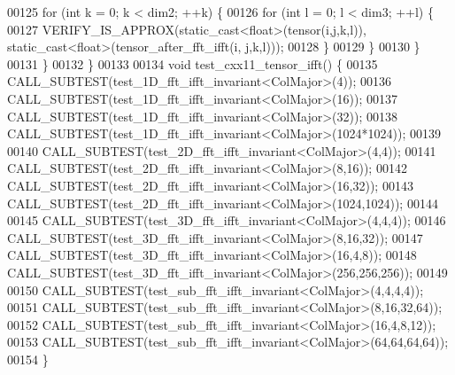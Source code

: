 \begin{DoxyCode}
00125       \textcolor{keywordflow}{for} (\textcolor{keywordtype}{int} k = 0; k < dim2; ++k) \{
00126         \textcolor{keywordflow}{for} (\textcolor{keywordtype}{int} l = 0; l < dim3; ++l) \{
00127           VERIFY\_IS\_APPROX(static\_cast<float>(tensor(i,j,k,l)), static\_cast<float>(tensor\_after\_fft\_ifft(i,
      j,k,l)));
00128         \}
00129       \}
00130     \}
00131   \}
00132 \}
00133 
00134 \textcolor{keywordtype}{void} test\_cxx11\_tensor\_ifft() \{
00135   CALL\_SUBTEST(test\_1D\_fft\_ifft\_invariant<ColMajor>(4));
00136   CALL\_SUBTEST(test\_1D\_fft\_ifft\_invariant<ColMajor>(16));
00137   CALL\_SUBTEST(test\_1D\_fft\_ifft\_invariant<ColMajor>(32));
00138   CALL\_SUBTEST(test\_1D\_fft\_ifft\_invariant<ColMajor>(1024*1024));
00139 
00140   CALL\_SUBTEST(test\_2D\_fft\_ifft\_invariant<ColMajor>(4,4));
00141   CALL\_SUBTEST(test\_2D\_fft\_ifft\_invariant<ColMajor>(8,16));
00142   CALL\_SUBTEST(test\_2D\_fft\_ifft\_invariant<ColMajor>(16,32));
00143   CALL\_SUBTEST(test\_2D\_fft\_ifft\_invariant<ColMajor>(1024,1024));
00144 
00145   CALL\_SUBTEST(test\_3D\_fft\_ifft\_invariant<ColMajor>(4,4,4));
00146   CALL\_SUBTEST(test\_3D\_fft\_ifft\_invariant<ColMajor>(8,16,32));
00147   CALL\_SUBTEST(test\_3D\_fft\_ifft\_invariant<ColMajor>(16,4,8));
00148   CALL\_SUBTEST(test\_3D\_fft\_ifft\_invariant<ColMajor>(256,256,256));
00149 
00150   CALL\_SUBTEST(test\_sub\_fft\_ifft\_invariant<ColMajor>(4,4,4,4));
00151   CALL\_SUBTEST(test\_sub\_fft\_ifft\_invariant<ColMajor>(8,16,32,64));
00152   CALL\_SUBTEST(test\_sub\_fft\_ifft\_invariant<ColMajor>(16,4,8,12));
00153   CALL\_SUBTEST(test\_sub\_fft\_ifft\_invariant<ColMajor>(64,64,64,64));
00154 \}
\end{DoxyCode}
